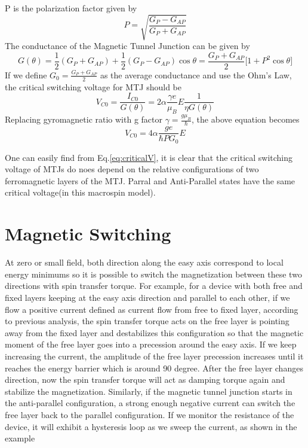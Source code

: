 P is the polarization factor given by
\begin{equation}
    P = \sqrt{\frac{G_P - G_{AP}}{ G_P + G_{AP}} }       
\end{equation}
The conductance of the Magnetic Tunnel Junction can be given by\cite{MTJConductance}
\begin{equation}
    G(\theta) = \frac{1}{2} (G_P + G_{AP}) + \frac{1}{2} (G_P - G_{AP}) \cos{\theta}
    = \frac{G_P + G_{AP}}{2}\big[ 1+P^2\cos{\theta} \big]
\end{equation}
If we define $G_0 = \frac{G_P + G_{AP}}{2}$ as the average conductance and use the Ohm's Law, the critical switching voltage for MTJ should be
\begin{equation}
    V_{C0} = \frac{I_{C0}}{G(\theta)} = 2\alpha\frac{\gamma e}{\mu_B}E\frac{1}{\eta G(\theta)}
\end{equation}
Replacing gyromagnetic ratio with g factor $\gamma = \frac{g \mu_B}{\hbar}$, the above equation becomes
\begin{equation}
    \label{eq:criticalV}
    V_{C0} = 4\alpha\frac{ge}{\hbar P G_0}E
\end{equation}

One can easily find from Eq.\ref{eq:criticalV}, it is clear that the critical switching voltage of MTJs do noes depend on the relative configurations of two ferromagnetic layers of the MTJ. Parral and Anti-Parallel states have the same critical voltage(in this macrospin model).  




\section{Magnetic Switching}

At zero or small field, both direction along the easy axis correspond to local energy minimums so it is possible to switch the magnetization between these two directions with spin transfer torque. For example, for a device with both free and fixed layers keeping at the easy axis direction and parallel to each other, if we flow a positive current defined as current flow from free to fixed layer, according to previous analysis, the spin transfer torque acts on the free layer is pointing away from the fixed layer and destabilizes this configuration so that the magnetic moment of the free layer goes into a precession around the easy axis. If we keep increasing the current, the amplitude of the free layer precession increases until it reaches the energy barrier which is around 90 degree. After the free layer changes direction, now the spin transfer torque will act as damping torque again and stabilize the magnetization. Similarly, if the magnetic tunnel junction starts in the anti-parallel configuration, a strong enough negative current can switch the free layer back to the parallel configuration. If we monitor the resistance of the device, it will exhibit a hysteresis loop as we sweep the current, as shown in the example

